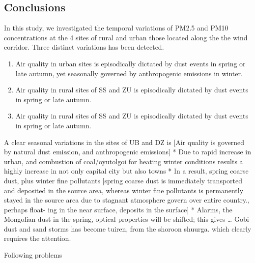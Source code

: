 \documentclass[
  11pt,
]{article}
\begin{document}
\newpage

\subsection{Conclusions}\label{conclusions-1}

In this study, we investigated the temporal variations of PM2.5 and PM10
concentrations at the 4 sites of rural and urban those located along the
the wind corridor. Three distinct variations has been detected.

\begin{enumerate}
    \item Air quality in urban sites is episodically dictated by dust events in spring or late autumn, yet seasonally governed by anthropogenic emissions in winter.
    \item Air quality in rural sites of SS and ZU is episodically dictated by dust events in spring or late autumn.
    \item Air quality in rural sites of SS and ZU is episodically dictated by dust events in spring or late autumn.
\end{enumerate}

A clear seasonal variations in the sites of UB and DZ is {[}Air quality
is governed by natural dust emission, and anthropogenic emissions{]} *
Due to rapid increase in urban, and combustion of coal/oyutolgoi for
heating winter conditions results a highly increase in not only capital
city but also towns * In a result, spring coarse dust, plus winter fine
pollutants {[}spring coarse dust is immediately transported and
deposited in the source area, whereas winter fine pollutants is
permanently stayed in the source area due to stagnant atmosphere govern
over entire country., perhaps float- ing in the near surface, deposits
in the surface{]} * Alarms, the Mongolian dust in the spring, optical
properties will be shifted; this gives \ldots{} Gobi dust and sand
storms has become tuiren, from the shoroon shuurga. which clearly
requires the attention.

Following problems
\end{document}
